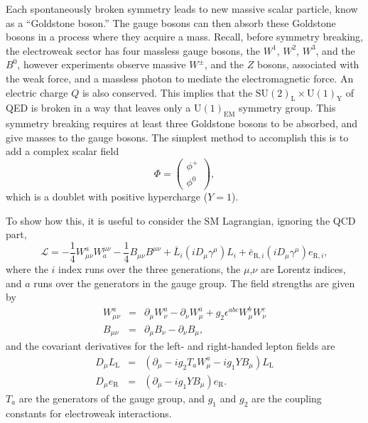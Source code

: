 Each spontaneously broken symmetry leads to new massive scalar particle, know
as a ``Goldstone boson.''
The gauge bosons can then absorb these Goldstone bosons in a process where they
acquire a mass.
Recall, before symmetry breaking, the electroweak sector has four massless
gauge bosons, the $W^1$, $W^2$,  $W^3$, and the $B^0$, however experiments
observe massive $W^{\pm}$, and the $Z$ bosons, associated with the weak force,
and a massless photon to mediate the electromagnetic force.
An electric charge $Q$ is also conserved.
This implies that the
$\mathrm{SU}(2)_\mathrm{L} \times \mathrm{U}(1)_\mathrm{Y}$ of QED is broken in
a way that leaves only a $\mathrm{U}(1)_\mathrm{EM}$ symmetry group.
This symmetry breaking requires at least three Goldstone bosons to be absorbed,
and give masses to the gauge bosons.
The simplest method to accomplish this is to add a complex scalar field
\begin{equation}
  \Phi = \begin{pmatrix} \phi^+ \\ \phi^0 \end{pmatrix},
    \label{eqn:scalar_field}
\end{equation}
which is a doublet with positive hypercharge ($Y=1$).

To show how this, it is useful to consider the SM Lagrangian, ignoring the
QCD part,
\begin{equation}
  \mathcal{L} =
  - \frac{1}{4} W_{\mu\nu}^{a} W_{a}^{\mu\nu}
  - \frac{1}{4} B_{\mu\nu} B^{\mu\nu}
  + \bar{L}_i \left(i D_{\mu} \gamma^{\mu} \right) L_i
  + \bar{e}_{\mathrm{R},i}\left(i D_{\mu} \gamma^{\mu}\right)e_{\mathrm{R},i},
\end{equation}
where the $i$ index runs over the three generations, the $\mu$,$\nu$ are
Lorentz indices, and $a$ runs over the generators in the gauge group.
The field strengths are given by
\begin{eqnarray}
  W_{\mu\nu}^{a} & = &
  \partial_{\mu}W_{\nu}^{a} - 
  \partial_{\nu}W_{\mu}^{a} +
  g_{2}\epsilon^{abc}W_{\mu}^{b}W_{\nu}^{c}
  \\
  B_{\mu\nu} & = &
  \partial_{\mu}B_{\nu} - 
  \partial_{\nu}B_{\mu},
\end{eqnarray}
and the covariant derivatives for the left- and right-handed lepton fields are
\begin{eqnarray}
  D_{\mu}L_\mathrm{L} & = &
  \left(
    \partial_{\mu} - ig_{2}T_{a}W_{\mu}^{a} - ig_{1}YB_{\mu}
  \right) L_\mathrm{L}
  \\
  D_{\mu}e_\mathrm{R} & = &
  \left(
    \partial_{\mu} - ig_{1}YB_{\mu}
  \right) e_\mathrm{R}.
\end{eqnarray}
$T_a$ are the generators of the gauge group, and $g_1$ and $g_2$ are the
coupling constants for electroweak interactions.

